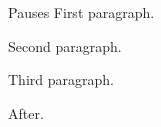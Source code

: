 \documentclass{beamer}
\begin{document}
\begin{frame}{Pauses}
First paragraph.

\pause
Second paragraph.

\pause
Third paragraph.
\end{frame}
\begin{frame}
After.
\end{frame}
\end{document}
